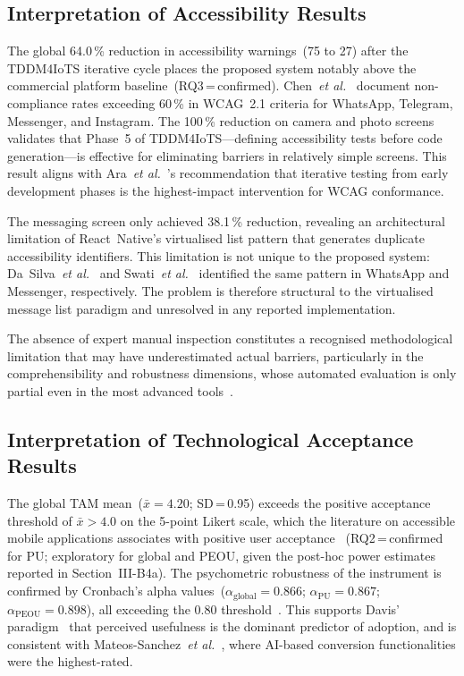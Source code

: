 \documentclass[journal]{IEEEtran}
\begin{document}
	\subsection{Interpretation of Accessibility Results}
	The global 64.0\,\% reduction in accessibility
	warnings~(75 to 27) after the TDDM4IoTS iterative cycle places
	the proposed system notably above the commercial platform
	baseline~(RQ3\,=\,confirmed).
	Chen~\textit{et al.}~\cite{chen2022} document non-compliance
	rates exceeding 60\,\% in WCAG~2.1 criteria for WhatsApp,
	Telegram, Messenger, and Instagram.
	The 100\,\% reduction on camera and photo screens validates
	that Phase~5 of TDDM4IoTS---defining accessibility tests before
	code generation---is effective for eliminating barriers in
	relatively simple screens.
	This result aligns with
	Ara~\textit{et al.}~\cite{ara2024}'s recommendation that
	iterative testing from early development phases is the
	highest-impact intervention for WCAG conformance.
	
	The messaging screen only achieved 38.1\,\% reduction, revealing
	an architectural limitation of React~Native's virtualised list
	pattern that generates duplicate accessibility identifiers.
	This limitation is not unique to the proposed system:
	Da~Silva~\textit{et al.}~\cite{dasilva2016} and
	Swati~\textit{et al.}~\cite{swati2021} identified the same
	pattern in WhatsApp and Messenger, respectively.
	The problem is therefore structural to the virtualised message
	list paradigm and unresolved in any reported implementation.
	
	The absence of expert manual inspection constitutes a recognised
	methodological limitation that may have underestimated actual
	barriers, particularly in the comprehensibility and robustness
	dimensions, whose automated evaluation is only partial even in
	the most advanced tools~\cite{ara2024}.
	
	\subsection{Interpretation of Technological Acceptance Results}
	The global TAM mean~($\bar{x}{=}4.20$; SD\,=\,0.95)
	exceeds the positive acceptance threshold of $\bar{x}{>}4.0$ on
	the 5-point Likert scale, which the literature on accessible mobile
	applications associates with positive user acceptance~\cite{kim2024,holden2010}
	(RQ2\,=\,confirmed for PU; exploratory for global and PEOU,
	given the post-hoc power estimates reported in
	Section~III-B4a).
	The psychometric robustness of the instrument is confirmed by
	Cronbach's alpha values~($\alpha_{\text{global}}{=}0.866$;
	$\alpha_{\text{PU}}{=}0.867$; $\alpha_{\text{PEOU}}{=}0.898$),
	all exceeding the 0.80 threshold~\cite{nunnally1978}.
	This supports Davis' paradigm~\cite{davis1989} that perceived
	usefulness is the dominant predictor of adoption, and is
	consistent with Mateos-Sanchez~\textit{et al.}~\cite{mateos2022},
	where AI-based conversion functionalities were the highest-rated.
	
\end{document}
